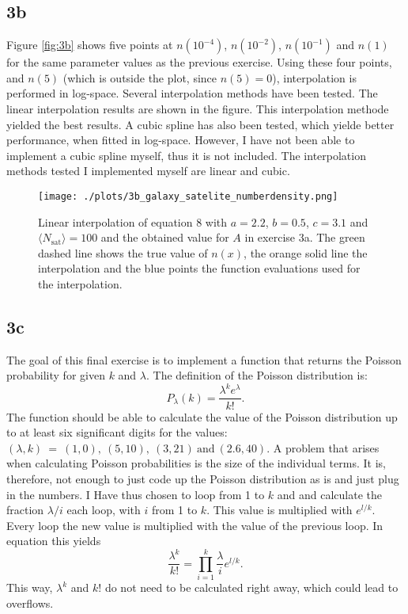 \subsection*{3b}
Figure \ref{fig:3b} shows five points at $n(10^{−4})$, $n(10^{−2})$, $n(10^{−1})$ and $n(1)$ for the same parameter values as the previous exercise. Using these four points, and $n(5)$ (which is outside the plot, since $n(5)=0$), interpolation is performed in log-space. Several interpolation methods have been tested. The linear interpolation results are shown in the figure. This interpolation methode yielded the best results. A cubic spline has also been tested, which yielde better performance, when fitted in log-space. However, I have not been able to implement a cubic spline myself, thus it is not included. The interpolation methods tested I implemented myself are linear and cubic.

\begin{figure}[h!]
  \centering
  \texttt{[image: ./plots/3b\_galaxy\_satelite\_numberdensity.png]}
  \caption{Linear interpolation of equation 8 with $a = 2.2$, $b = 0.5$, $c = 3.1$ and $\langle N_\mathrm{sat}\rangle = 100$ and the obtained value for $A$ in exercise 3a. The green dashed line shows the true value of $n(x)$, the orange solid line the interpolation and the blue points the function evaluations used for the interpolation.}
  \label{fig:3a}
\end{figure}

\subsection*{3c}
The goal of this final exercise is to implement a function that returns the Poisson probability for given $k$ and $\lambda$. The definition of the Poisson distribution is:
\begin{equation}
  P_\lambda(k)=\frac{\lambda^k e^{\lambda}}{k!}.
\end{equation}
The function should be able to calculate the value of the Poisson distribution up to at least six significant digits for the values: $(\lambda, k)\ =\ (1, 0),\ (5, 10),\ (3, 21)\ \mathrm{and}\ (2.6, 40)$. A problem that arises when calculating Poisson probabilities is the size of the individual terms. It is, therefore, not enough to just code up the Poisson distribution as is and just plug in the numbers. I Have thus chosen to loop from 1 to $k$ and and calculate the fraction $\lambda / i$ each loop, with $i$ from 1 to $k$. This value is multiplied with $e^{l/k}$. Every loop the new value is multiplied with the value of the previous loop. In equation this yields
\begin{equation}
  \frac{\lambda^k}{k!} = \prod_{i=1}^k \frac{\lambda}{i} e^{l/k}.
\end{equation}
This way, $\lambda^k$ and $k!$ do not need to be calculated right away, which could lead to overflows. 

